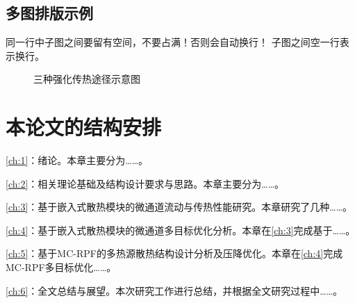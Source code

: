 \subsection{多图排版示例}
同一行中子图之间要留有空间，不要占满！否则会自动换行！
子图之间空一行表示换行。

\begin{figure}[htb]

    \caption{三种强化传热途径示意图}
    \label{fig:Three-enhanced-heat-transfer-paths}
\end{figure}


\section{本论文的结构安排}
\cref{ch:1}：绪论。本章主要分为……。

\cref{ch:2}：相关理论基础及结构设计要求与思路。本章主要分为……。

\cref{ch:3}：基于嵌入式散热模块的微通道流动与传热性能研究。本章研究了几种……。

\cref{ch:4}：基于嵌入式散热模块的微通道多目标优化分析。本章在\cref{ch:3}完成基于……。

\cref{ch:5}：基于MC-RPF的多热源散热结构设计分析及压降优化。本章在\cref{ch:4}完成MC-RPF多目标优化……。

\cref{ch:6}：全文总结与展望。本次研究工作进行总结，并根据全文研究过程中……。


